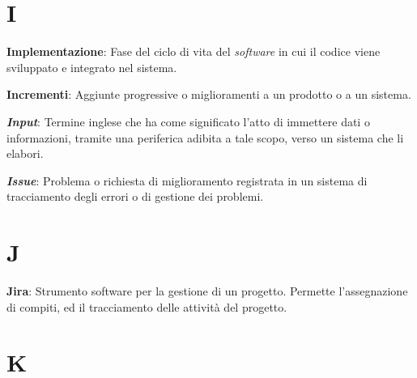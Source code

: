 \documentclass[5pt]{article}
\begin{document}
\pagebreak

\section*{I}
\begin{flushleft}

\textbf{Implementazione}: Fase del ciclo di vita del \textit{software} in cui il codice viene sviluppato e integrato nel sistema.\newline

\textbf{Incrementi}: Aggiunte progressive o miglioramenti a un prodotto o a un sistema.\newline

\textbf{\textit{Input}}: Termine inglese che ha come significato l'atto di immettere dati o informazioni, tramite una periferica adibita a tale scopo, verso un sistema che li elabori.\newline

\textbf{\textit{Issue}}: Problema o richiesta di miglioramento registrata in un sistema di tracciamento degli errori o di gestione dei problemi.\newline


\end{flushleft}

\pagebreak

\section*{J}
\begin{flushleft}
	\textbf{Jira}: Strumento software per la gestione di un progetto. Permette l'assegnazione di compiti, ed il tracciamento delle attività del progetto.  \newline
\end{flushleft}

\pagebreak

\section*{K}
\begin{flushleft}
	
\end{flushleft}
\end{document}
